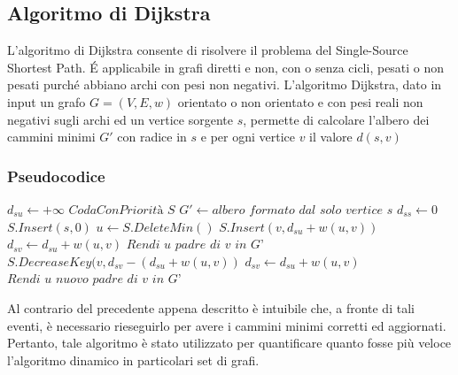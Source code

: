 \documentclass[a4paper]{article}
\begin{document}
\subsection{Algoritmo di Dijkstra}
L'algoritmo di Dijkstra consente di risolvere il problema del Single-Source Shortest Path. É applicabile in grafi diretti e non, con o senza cicli, pesati o non pesati purché abbiano archi con pesi non negativi.
L'algoritmo Dijkstra, dato in input un grafo $G=(V,E,w)$ orientato o non orientato e con pesi reali non negativi sugli archi ed un vertice sorgente $s$, permette di calcolare l'albero dei cammini minimi $G'$ con radice in $s$ e per ogni vertice $v$ il valore $d(s,v)$
\subsubsection{Pseudocodice}

\begin{algorithm}
\caption{$Dijkstra\,(grafo\; G, vertice\; s) \rightarrow albero\; G'$}\label{euclid}
\begin{algorithmic}[1]
\State $d_{su} \gets +\infty$
\EndFor
\State $\textit{CodaConPriorità S}$
\State $G' \gets \textit{albero formato dal solo vertice s}$
\State $d_{ss} \gets 0$
\State $S.Insert(s,0)$
\State $u \gets S.DeleteMin()$
\State $S.Insert(v, d_{su}+w(u,v))$
\State $d_{sv} \gets d_{su}+w(u,v)$
\State $\textit{Rendi u padre di v in G'}$
\State $S.DecreaseKey(v, d_{sv}-(d_{su} + w(u,v))$
\State $d_{sv} \gets d_{su}+w(u,v)$
\State $\textit{Rendi u nuovo padre di v in G'}$
\EndIf
\EndFor
\EndWhile
{}
\end{algorithmic}
\end{algorithm}
Al contrario del precedente appena descritto è intuibile che, a fronte di tali eventi, è necessario rieseguirlo per avere i cammini minimi corretti ed aggiornati. 
Pertanto, tale algoritmo è stato utilizzato per quantificare quanto fosse più veloce l'algoritmo dinamico in particolari set di grafi.
\newpage
\end{document}
